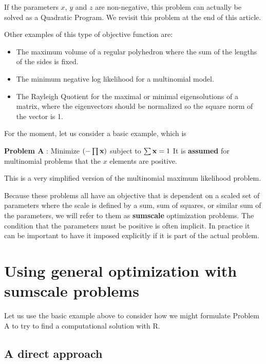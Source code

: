 \documentclass[11pt]{article}\usepackage[]{graphicx}\usepackage[]{color}
\newcommand{\B}[1]{{\bf #1 \rm}}
\newcommand{\R}{{\sf R}}
\begin{document}
If the parameters $x$, $y$ and $z$ are non-negative, this problem can actually 
be solved as a Quadratic Program. We revisit this problem at the end of this
article.

Other examples of this type of objective function are:

\begin{itemize}
\item{The maximum volume  of a regular polyhedron where the sum of the lengths
of the sides is fixed.}
\item{The minimum negative log likelihood for a multinomial model.}
\item{The Rayleigh Quotient for the maximal or minimal eigensolutions of a matrix, where
the eigenvectors should be normalized so the square norm of the vector is 1.}
\end{itemize}

For the moment, let us consider a basic example, which is 
\vspace*{10pt}

\B{Problem A}: Minimize  $( - \prod{\B{x}})$ subject to $\sum{\B{x}}=1$
It is \textbf{assumed} for multinomial problems that the $x$ elements are positive.
\vspace*{10pt}

This is a very simplified version of the multinomial maximum likelihood problem. 

Because these problems all have an objective that is dependent on a scaled set of parameters 
where the scale is defined by a sum, sum of squares, or similar sum of the parameters, we will
refer to them as \B{sumscale} optimization problems. The condition that the parameters
must be positive is often implicit. In practice it can be important to have it imposed
explicitly if it is part of the actual problem. 

\section{Using general optimization with sumscale problems}

Let us use the basic example above to consider how we might formulate Problem A to try
to find a computational solution with \R. 

\subsection{A direct approach}
\end{document}
